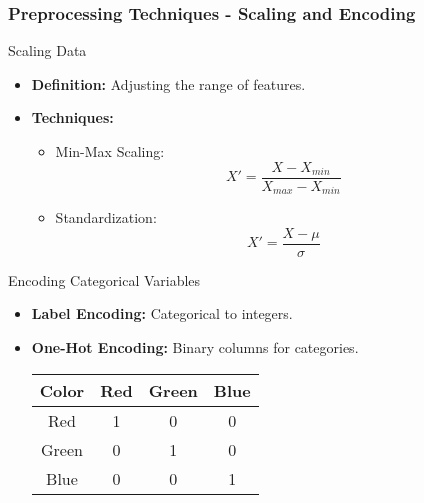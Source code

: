 \documentclass[aspectratio=169]{beamer}
\begin{document}
\begin{frame}[fragile]
    \frametitle{Preprocessing Techniques - Scaling and Encoding}
    \begin{block}{Scaling Data}
        \begin{itemize}
            \item \textbf{Definition:} Adjusting the range of features.
            \item \textbf{Techniques:}
                \begin{itemize}
                    \item Min-Max Scaling: 
                    \begin{equation*}
                        X' = \frac{X - X_{min}}{X_{max} - X_{min}}
                    \end{equation*} 
                    \item Standardization: 
                    \begin{equation*}
                        X' = \frac{X - \mu}{\sigma}
                    \end{equation*}
                \end{itemize}
        \end{itemize}
    \end{block}
    
    \begin{block}{Encoding Categorical Variables}
        \begin{itemize}
            \item \textbf{Label Encoding:} Categorical to integers.
            \item \textbf{One-Hot Encoding:} Binary columns for categories.
            \begin{table}[h]
                \centering
                \begin{tabular}{|c|c|c|c|}
                    \hline
                    Color  & Red & Green & Blue \\ \hline
                    Red    &  1  &   0   &  0   \\ \hline
                    Green  &  0  &   1   &  0   \\ \hline
                    Blue   &  0  &   0   &  1   \\ \hline
                \end{tabular}
            \end{table}
        \end{itemize}
    \end{block}

\end{frame}
\end{document}
